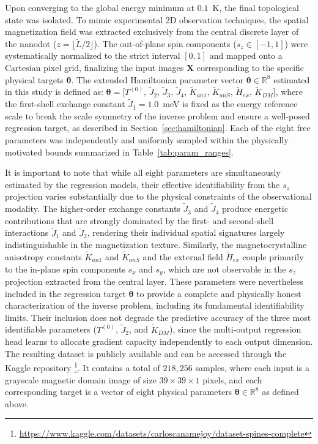 \documentclass[a4paper,fleqn]{cas-sc}
\begin{document}
Upon converging to the global energy minimum at $0.1$~K, 
the final topological state was isolated. To mimic 
experimental 2D observation techniques, the spatial 
magnetization field was extracted exclusively from the 
central discrete layer of the nanodot 
($z = \lfloor \breve{L}/2 \rfloor$). The out-of-plane 
spin components ($s_z \in [-1, 1]$) were systematically 
normalized to the strict interval $[0, 1]$ and mapped 
onto a Cartesian pixel grid, finalizing the input images 
$\mathbf{X}$ corresponding to the specific physical 
targets $\boldsymbol{\theta}$. The extended Hamiltonian 
parameter vector $\boldsymbol{\theta} \in \mathbb{R}^8$ 
estimated in this study is defined as:
$\boldsymbol{\theta} = \bigl[T^{(0)},\, \tilde{J}_2,\, 
\tilde{J}_3,\, \tilde{J}_4,\, \tilde{K}_{an1},\, 
\tilde{K}_{anS},\, \tilde{H}_{ex},\, 
\tilde{K}_{DM}\bigr]$,
where the first-shell exchange constant $\tilde{J}_1 = 
1.0$~meV is fixed as the energy reference scale to 
break the scale symmetry of the inverse problem and 
ensure a well-posed regression target, as described 
in Section~\ref{sec:hamiltonian}. Each of the eight 
free parameters was independently and uniformly sampled 
within the physically motivated bounds summarized in 
Table~\ref{tab:param_ranges}.

It is important to note that while all eight parameters 
are simultaneously estimated by the regression models, 
their effective identifiability from the $s_z$ 
projection varies substantially due to the physical 
constraints of the observational modality. The 
higher-order exchange constants $\tilde{J}_3$ and 
$\tilde{J}_4$ produce energetic contributions that are 
strongly dominated by the first- and second-shell 
interactions $\tilde{J}_1$ and $\tilde{J}_2$, rendering 
their individual spatial signatures largely 
indistinguishable in the magnetization texture. Similarly, 
the magnetocrystalline anisotropy constants 
$\tilde{K}_{an1}$ and $\tilde{K}_{anS}$ and the 
external field $\tilde{H}_{ex}$ couple primarily to 
the in-plane spin components $s_x$ and $s_y$, which 
are not observable in the $s_z$ projection extracted 
from the central layer. These parameters were 
nevertheless included in the regression target 
$\boldsymbol{\theta}$ to provide a complete and 
physically honest characterization of the inverse 
problem, including its fundamental identifiability 
limits. Their inclusion does not degrade the 
predictive accuracy of the three most identifiable 
parameters ($T^{(0)}$, $\tilde{J}_2$, and 
$\tilde{K}_{DM}$), since the multi-output regression 
head learns to allocate gradient capacity independently 
to each output dimension. The resulting dataset is 
publicly available and can be accessed through the 
Kaggle repository%
\footnote{\url{https://www.kaggle.com/datasets/carloscanamejoy/dataset-spines-complete}}. 
It contains a total of $218{,}256$ samples, where 
each input is a grayscale magnetic domain image of 
size $39 \times 39 \times 1$ pixels, and each 
corresponding target is a vector of eight physical 
parameters $\boldsymbol{\theta} \in \mathbb{R}^8$ 
as defined above.
\end{document}
